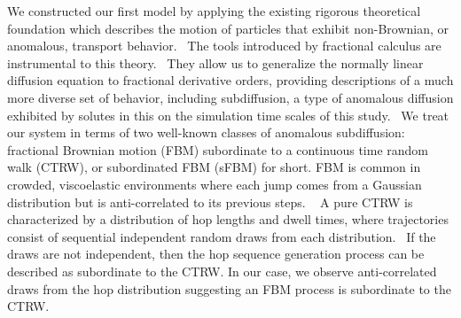 \documentclass[journal=jctcce,manuscript=article]{achemso}
\begin{document}
  
  We constructed our first model by applying the existing rigorous theoretical
  foundation which describes the motion of particles that exhibit non-Brownian,
  or anomalous, transport behavior.~\cite{metzler_random_2000,bouchaud_anomalous_1990} The tools
  introduced by fractional calculus are instrumental to this
  theory.~\cite{gorenflo_fractional_1997} They allow us to generalize the
  normally linear diffusion equation to fractional derivative orders, providing
  descriptions of a much more diverse set of behavior, including subdiffusion,
  a type of anomalous diffusion exhibited by solutes in this on the simulation 
  time scales of this study.~\cite{klages_anomalous_2008}
  We treat our system in terms of two well-known classes of anomalous
  subdiffusion: fractional Brownian motion (FBM) subordinate to a 
  continuous time random walk (CTRW), or subordinated FBM (sFBM) for short. 
  FBM is common in crowded, viscoelastic environments where each jump comes 
  from a Gaussian distribution but is anti-correlated to its previous steps.
  ~\cite{mandelbrot_fractional_1968,jeon_fractional_2010,banks_anomalous_2005}
  A pure CTRW is characterized by a distribution of hop lengths and dwell times, 
  where trajectories consist of sequential independent random draws from each
  distribution.~\cite{montroll_random_1965} If the draws are not independent,
  then the hop sequence generation process can be described as subordinate to
  the CTRW. In our case, we observe anti-correlated draws from the hop distribution
  suggesting an FBM process is subordinate to the CTRW.

\end{document}
